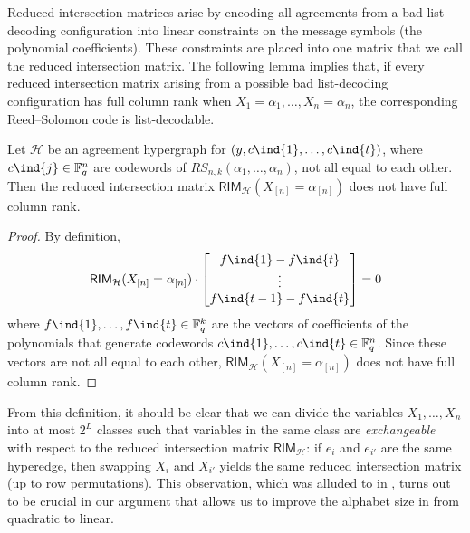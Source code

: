 \documentclass{article}[11pt]
\begin{document}
  Reduced intersection matrices arise by encoding all agreements from a bad list-decoding configuration into linear constraints on the message symbols (the polynomial coefficients). These constraints are placed into one matrix that we call the reduced intersection matrix.
  The following lemma implies that, if every reduced intersection matrix arising from a possible bad list-decoding configuration has full column rank when $X_1=\alpha_1,\dots,X_n=\alpha_n$, the corresponding Reed--Solomon code is list-decodable. 
  
\begin{lemma}
    Let $\mathcal{H}$ be an agreement hypergraph for $(y,c\ind{1},\dots,c\ind{t})$, where $c\ind{j}\in\mathbb{F}_q^n$ are codewords of $RS_{n,k}(\alpha_1,\dots,\alpha_n)$, not all equal to each other.
    Then the reduced intersection matrix $\mathsf{RIM}_\mathcal{H}(X_{[n]}=\alpha_{[n]})$ does not have full column rank. \label{lem:eval}
\end{lemma}
\begin{proof}
    By definition, 
    \begin{align}
        \mathsf{RIM}_\mathcal{H}(X_{[n]}=\alpha_{[n]}) \cdot 
        \begin{bmatrix}
            f\ind{1}-f\ind{t}\\
            \vdots\\
            f\ind{t-1}-f\ind{t}
        \end{bmatrix}= 0
    \end{align}
    where $f\ind{1},\dots,f\ind{t}\in\mathbb{F}_q^{k}$ are the vectors of coefficients of the polynomials that generate codewords $c\ind{1},\dots,c\ind{t}\in\mathbb{F}_q^n$.
    Since these vectors are not all equal to each other, $\mathsf{RIM}_\mathcal{H}(X_{[n]}=\alpha_{[n]})$ does not have full column rank.
\end{proof}
\begin{remark}
From this definition, it should be clear that we can divide the variables $X_1,\dots,X_n$ into at most $2^L$ classes such that variables in the same class are \emph{exchangeable} with respect to the reduced intersection matrix $\mathsf{RIM}_\mathcal{H}$: if $e_i$ and $e_{i'}$ are the same hyperedge, then swapping $X_i$ and $X_{i'}$ yields the same reduced intersection matrix (up to row permutations). 
This observation, which was alluded to in \cite{GZ23}, turns out to be crucial in our argument that allows us to improve the alphabet size in \cite{GZ23} from quadratic to linear.
\label{rem:exchangable}
\end{remark}
\end{document}
